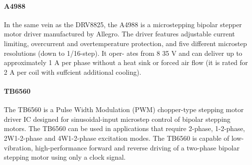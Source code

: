 \paragraph{A4988}
In the same vein as the DRV8825, the A4988 is a microstepping bipolar stepper motor driver manufactured by Allegro.
The driver features adjustable current limiting, overcurrent and overtemperature protection, and ﬁve different microstep resolutions (down to 1/16-step).
It oper- ates from 8 35 V and can deliver up to approximately 1 A per phase without a heat sink or forced air ﬂow (it is rated for 2 A per coil with suffcient additional cooling).

\paragraph{TB6560}
The TB6560 is a Pulse Width Modulation (PWM) chopper-type stepping motor driver IC designed for sinusoidal-input microstep control of bipolar stepping motors.
The TB6560 can be used in applications that require 2-phase, 1-2-phase, 2W1-2-phase and 4W1-2-phase excitation modes.
The TB6560 is capable of low-vibration, high-performance forward and reverse driving of a two-phase bipolar stepping motor using only a clock signal.